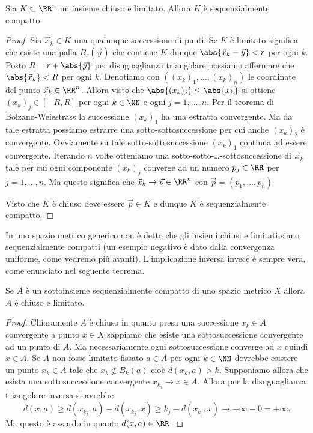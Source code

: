\begin{theorem}[compattezza in $\RR^n$]%
  \label{th:compattezza_Rn}%
Sia $K\subset \RR^n$ un insieme chiuso e limitato. 
Allora $K$ è sequenzialmente compatto.
\end{theorem}
\begin{proof}
Sia $\vec x_k\in K$ una qualunque successione di punti. 
Se $K$ è limitato significa che esiste una palla $B_r(\vec y)$ 
che contiene $K$ dunque $\abs{\vec x_k - \vec y} < r$ per ogni $k$.
Posto $R=r+\abs{\vec y}$ per disuguaglianza triangolare possiamo affermare 
che $\abs{\vec x_k} < R$ per ogni $k$. 
Denotiamo con $((x_k)_1, \dots, (x_k)_n)$ le coordinate 
del punto $\vec x_k\in \RR^n$. 
Allora visto che $\abs{(x_k)_j}\le \abs{x_k}$ si ottiene $(x_k)_j\in [-R,R]$
per ogni $k\in\NN$ e ogni $j=1,\dots, n$.
Per il teorema di Bolzano-Weiestrass la successione $(x_k)_1$ ha una estratta 
convergente. Ma da tale estratta possiamo estrarre una sotto-sottosuccessione 
per cui anche $(x_k)_2$ è convergente. 
Ovviamente su tale sotto-sottosuccessione $(x_k)_1$ continua ad essere convergente.
Iterando $n$ volte otteniamo una sotto-sotto-\dots-sottosuccessione di $\vec x_k$ 
tale per cui ogni componente $(x_k)_j$ converge ad un numero $p_j\in \RR$
per $j=1,\dots, n$.
Ma questo significa che $\vec x_k \to \vec p \in \RR^n$ con $\vec p = (p_1,\dots, p_n)$

Visto che $K$ è chiuso deve essere $\vec p\in K$ e dunque $K$ è sequenzialmente compatto.
\end{proof}

In uno spazio metrico generico non è detto che gli insiemi chiusi e limitati 
siano sequenzialmente compatti (un esempio negativo è dato dalla convergenza uniforme, come
vedremo più avanti). 
L'implicazione inversa invece è sempre vera, come enunciato nel
seguente teorema.

\begin{theorem}%
\mymark{**}%
Se $A$ è un sottoinsieme sequenzialmente compatto 
di uno spazio metrico $X$
allora $A$ è chiuso e limitato.
\end{theorem}
%
\begin{proof}
Chiaramente $A$ è chiuso in quanto presa una successione $x_k\in A$ convergente a punto $x\in X$
sappiamo che esiste una sottosuccessione convergente ad un punto di $A$. Ma necessariamente ogni sottosuccessione converge ad $x$ quindi $x\in A$. Se $A$ non fosse limitato
fissato $a\in A$ per ogni $k\in \NN$ dovrebbe esistere un punto $x_k\in A$ tale che $x_k \not\in B_k(a)$
cioè $d(x_k,a) > k$. Supponiamo allora che esista una sottosuccessione convergente $x_{k_j}\to x \in A$. Allora per la disuguaglianza triangolare inversa si avrebbe
\[
  d(x, a) \ge d(x_{k_j}, a) - d(x_{k_j},x)
   \ge k_j - d(x_{k_j},x) \to +\infty - 0 = +\infty.
\]
Ma questo è assurdo in quanto $d(x,a)\in \RR$.
\end{proof}

